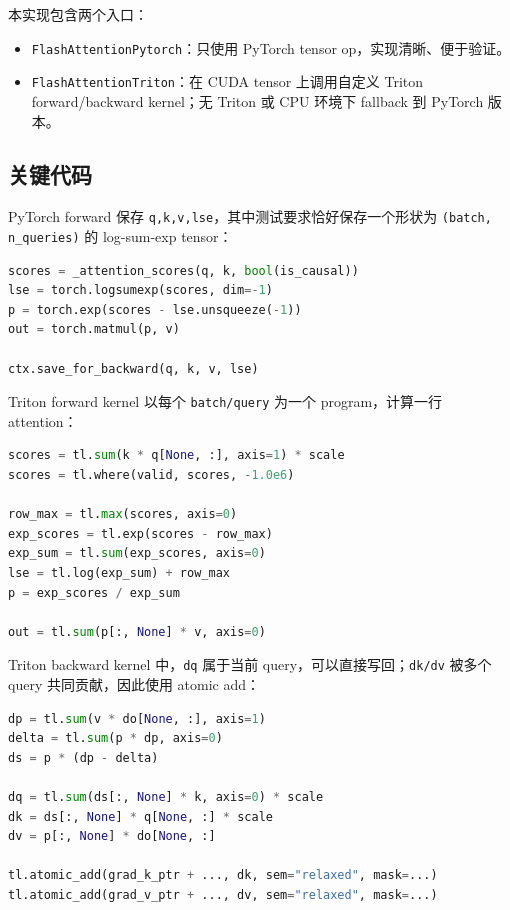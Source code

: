 \documentclass[UTF8,11pt]{ctexart}
\begin{document}
本实现包含两个入口：

\begin{itemize}
  \item \texttt{FlashAttentionPytorch}：只使用 PyTorch tensor op，实现清晰、便于验证。
  \item \texttt{FlashAttentionTriton}：在 CUDA tensor 上调用自定义 Triton forward/backward kernel；无 Triton 或 CPU 环境下 fallback 到 PyTorch 版本。
\end{itemize}

\subsection{关键代码}

PyTorch forward 保存 \texttt{q,k,v,lse}，其中测试要求恰好保存一个形状为
\texttt{(batch, n\_queries)} 的 log-sum-exp tensor：

\begin{lstlisting}[language=Python]
scores = _attention_scores(q, k, bool(is_causal))
lse = torch.logsumexp(scores, dim=-1)
p = torch.exp(scores - lse.unsqueeze(-1))
out = torch.matmul(p, v)

ctx.save_for_backward(q, k, v, lse)
\end{lstlisting}

Triton forward kernel 以每个 \texttt{batch/query} 为一个 program，计算一行 attention：

\begin{lstlisting}[language=Python]
scores = tl.sum(k * q[None, :], axis=1) * scale
scores = tl.where(valid, scores, -1.0e6)

row_max = tl.max(scores, axis=0)
exp_scores = tl.exp(scores - row_max)
exp_sum = tl.sum(exp_scores, axis=0)
lse = tl.log(exp_sum) + row_max
p = exp_scores / exp_sum

out = tl.sum(p[:, None] * v, axis=0)
\end{lstlisting}

Triton backward kernel 中，\texttt{dq} 属于当前 query，可以直接写回；\texttt{dk/dv} 被多个 query 共同贡献，因此使用 atomic add：

\begin{lstlisting}[language=Python]
dp = tl.sum(v * do[None, :], axis=1)
delta = tl.sum(p * dp, axis=0)
ds = p * (dp - delta)

dq = tl.sum(ds[:, None] * k, axis=0) * scale
dk = ds[:, None] * q[None, :] * scale
dv = p[:, None] * do[None, :]

tl.atomic_add(grad_k_ptr + ..., dk, sem="relaxed", mask=...)
tl.atomic_add(grad_v_ptr + ..., dv, sem="relaxed", mask=...)
\end{lstlisting}
\end{document}
